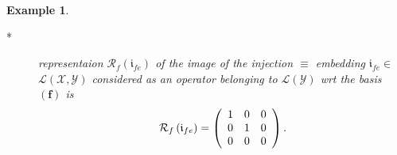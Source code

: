 \documentclass[aps,preprint]{revtex4}%
\newtheorem{example}[theorem]{Example}
\begin{document}
\begin{example}
\begin{enumerate}
\begin{enumerate}
\begin{description}
\item[*] representaion $\mathcal{R}_{f}\left(  \mathfrak{i}_{fe}\right)  $ of
the image of the injection $\equiv$ embedding $\mathfrak{i}_{fe}\in$
$\mathcal{L}\left(  \mathcal{X},\mathcal{Y}\right)  $ considered as an
operator belonging to $\mathcal{L}\left(  \mathcal{Y}\right)  $ wrt the basis
$\left(  \mathbf{f}\right)  $ is
\begin{equation}
\mathcal{R}_{f}\left(  \mathfrak{i}_{fe}\right)  =\left(
\begin{array}
[c]{ccc}%
1 & 0 & 0\\
0 & 1 & 0\\
0 & 0 & 0
\end{array}
\right)  .
\end{equation}

\end{description}


\end{enumerate}
\end{enumerate}
\end{example}
\end{document}
